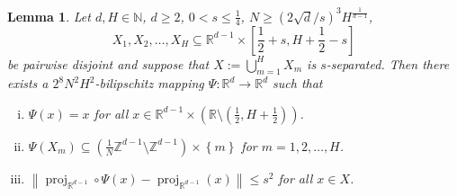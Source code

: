 \documentclass[a4paper, bibliography=totoc]{scrartcl}
\newtheorem{lemma}[define]{Lemma}
\numberwithin{claimcounter}{define}
\newcommand{\R}{\mathbb{R}}
\newcommand{\Z}{\mathbb{Z}}
\newcommand{\N}{\mathbb{N}}
\DeclareMathOperator{\proj}{proj}
\newcommand{\enorm}[1]{\left\|#1\right\|}
\newcommand{\set}[1]{\left\{#1\right\}}
\newcommand{\br}[1]{\left(#1\right)}
\newcommand{\sqbr}[1]{\left[#1\right]}
\begin{document}
\begin{lemma}\label{lemma:inj_rounding}
	Let $d,H\in\N$, $d\geq2$, $0<s\leq\frac{1}{4}$, $N\geq(2\sqrt{d}/s)^3H^{\frac{1}{d-1}}$,
	\begin{equation*}
	X_{1},X_{2},\ldots,X_{H}\subseteq \R^{d-1}\times \sqbr{\frac{1}{2}+s,H+\frac{1}{2}-s} 
	\end{equation*}
	be pairwise disjoint and suppose that $X:=\displaystyle\bigcup_{m=1}^{H}X_{m}$ is $s$-separated. 
	Then there exists a $\displaystyle 2^{8}N^{2}H^{2}$-bilipschitz mapping $\Psi\colon \R^{d}\to\R^{d}$ such that
	\begin{enumerate}[(i)]
		\item\label{Xi_i} $\Psi(x)=x$ for all $x\in\R^{d-1}\times\br{\R\setminus \br{\frac{1}{2},H+\frac{1}{2}}}$.
		\item\label{Xi_ii} $\Psi(X_{m})\subseteq \br{\frac{1}{N}\Z^{d-1}\setminus \Z^{d-1}}\times\set{m}$ for $m=1,2,\ldots,H$.
		\item\label{Xi_iii} $\enorm{\proj_{\R^{d-1}}\circ \Psi(x)-\proj_{\R^{d-1}}(x)}\leq s^{2}$ for all $x\in X$.
	\end{enumerate}
\end{lemma}
\end{document}
